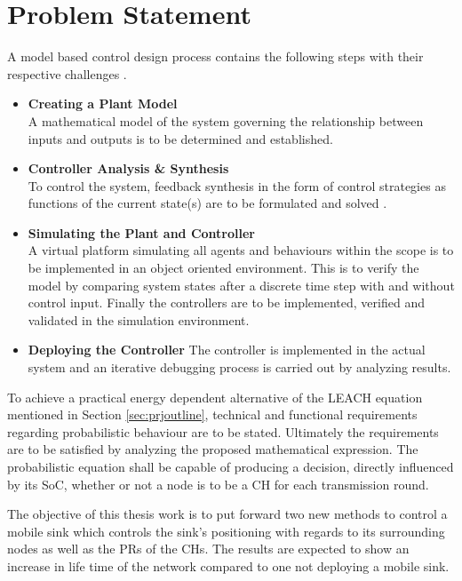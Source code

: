 \section{Problem Statement}
\label{ProbStatement}
A model based control design process contains the following steps with their respective challenges \cite{MBCDP}.
\begin{itemize}
    \item \textbf{Creating a Plant Model} \\
    A mathematical model of the system governing the relationship between inputs and outputs is to be determined and established.
    \item \textbf{Controller Analysis \& Synthesis} \\
    To control the system, feedback synthesis in the form of control strategies as functions of the current state(s) are to be formulated and solved \cite{OptSynthContr}.
    \item \textbf{Simulating the Plant and Controller} \\
    A virtual platform simulating all agents and behaviours within the scope is to be implemented in an object oriented environment. This is to verify the model by comparing system states after a discrete time step with and without control input. Finally the controllers are to be implemented, verified and validated in the simulation environment.
    \item \textbf{Deploying the Controller}
    The controller is implemented in the actual system and an iterative debugging process is carried out by analyzing results.
\end{itemize}
\noindent To achieve a practical energy dependent alternative of the LEACH equation mentioned in Section \ref{sec:prjoutline}, technical and functional requirements regarding probabilistic behaviour are to be stated. Ultimately the requirements are to be satisfied by analyzing the proposed mathematical expression. 
The probabilistic equation shall be capable of producing a decision, directly influenced by its SoC, whether or not a node is to be a CH for each transmission round.\newline

\noindent The objective of this thesis work is to put forward two new methods to control a mobile sink which controls the sink's positioning with regards to its surrounding nodes as well as the PRs of the CHs. The results are expected to show an increase in life time of the network compared to one not deploying a mobile sink.  

